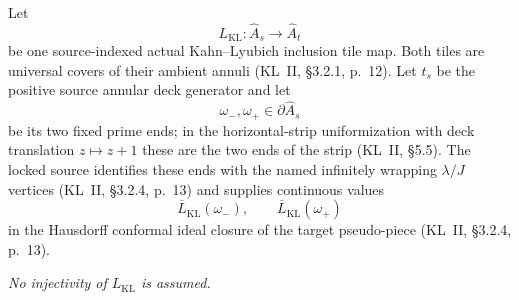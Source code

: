 \begin{definition}\label{def:kl-tile-system}
Let
\begin{equation}\label{eq:kl-tile-map}
L_{\mathrm{KL}}\colon\widehat A_s\longrightarrow\widehat A_t
\end{equation}
be one source-indexed actual Kahn--Lyubich inclusion tile map.  Both tiles are universal covers of their ambient annuli (KL~II, \S3.2.1, p.~12).  Let \(t_s\) be the positive source annular deck generator and let
\begin{equation}\label{eq:kl-wrapping-ends}
\omega_-,\omega_+\in\partial\widehat A_s
\end{equation}
be its two fixed prime ends; in the horizontal-strip uniformization with deck translation \(z\mapsto z+1\) these are the two ends of the strip (KL~II, \S5.5).  The locked source identifies these ends with the named infinitely wrapping \(\lambda/J\) vertices (KL~II, \S3.2.4, p.~13) and supplies continuous values
\begin{equation}\label{eq:kl-boundary-values}
\overline L_{\mathrm{KL}}(\omega_-),\qquad \overline L_{\mathrm{KL}}(\omega_+)
\end{equation}
in the Hausdorff conformal ideal closure of the target pseudo-piece (KL~II, \S3.2.4, p.~13).

\emph{No injectivity of \(L_{\mathrm{KL}}\) is assumed.}
\end{definition}

